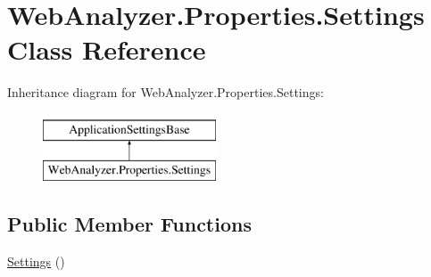 \hypertarget{class_web_analyzer_1_1_properties_1_1_settings}{}\section{Web\+Analyzer.\+Properties.\+Settings Class Reference}
\label{class_web_analyzer_1_1_properties_1_1_settings}
Inheritance diagram for Web\+Analyzer.\+Properties.\+Settings\+:\begin{figure}[H]
\begin{center}
\leavevmode
\includegraphics[height=2.000000cm]{class_web_analyzer_1_1_properties_1_1_settings}
\end{center}
\end{figure}
\subsection*{Public Member Functions}
\begin{DoxyCompactItemize}
\item 
\hyperlink{class_web_analyzer_1_1_properties_1_1_settings_abe4ec5eb9d0040b8f25200d2b988f110}{Settings} ()
\end{DoxyCompactItemize}
